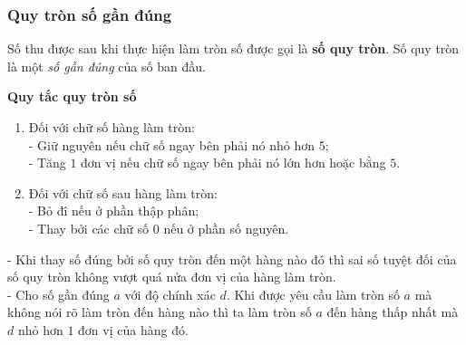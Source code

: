 \subsubsection{Quy tròn số gần đúng}
\begin{boxdn}
	Số thu được sau khi thực hiện làm tròn số được gọi là \textbf{số quy tròn}. Số quy tròn là một \textit{số gần đúng} của số ban đầu.
\end{boxdn}
\textbf{Quy tắc quy tròn số}
\begin{enumerate}
	\item Đối với chữ số hàng làm tròn:\\
	- Giữ nguyên nếu chữ số ngay bên phải nó nhỏ hơn $5$;\\
	- Tăng $1$ đơn vị nếu chữ số ngay bên phải nó lớn hơn hoặc bằng $5$.
	\item Đối với chữ số sau hàng làm tròn:\\
	- Bỏ đî nếu ở phần thập phân;\\
	- Thay bởi các chữ số $0$ nếu ở phần số nguyên.
\end{enumerate}
\begin{nx}
- Khi thay số đúng bởi số quy tròn đến một hàng nào đó thì sai số tuyệt đối của số quy tròn không vượt quá nửa đơn vị của hàng làm tròn.\\
- Cho số gần đúng $a$ với độ chính xác $d$. Khi được yêu cầu làm tròn số $a$ mà không nói rõ làm tròn đến hàng nào thì ta làm tròn số $a$ đến hàng thấp nhất mà $d$ nhỏ hơn $1$ đơn vị của hàng đó.
\end{nx}
